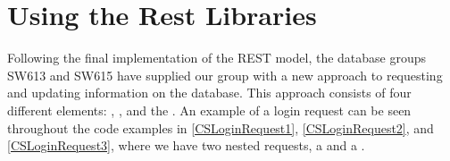 % 
% 

\section{Using the Rest Libraries}\label{UsingRest}
Following the final implementation of the REST model, the database groups SW613
and SW615 have supplied our group with a new approach to requesting and updating
information on the database. This approach consists of four different
elements: , , 
and the . An example of a login request can be seen throughout the
code examples in \autoref{CSLoginRequest1}, \autoref{CSLoginRequest2}, and
\autoref{CSLoginRequest3}, where we have two nested requests, a
 and a .\nl

